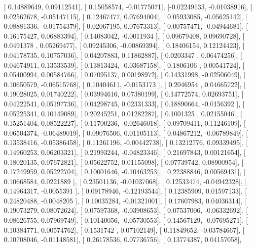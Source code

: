 \documentclass{article}
\begin{document}
       [ 0.14889649,  0.09112541],
       [ 0.15058574, -0.01775071],
       [-0.02249133, -0.01038916],
       [ 0.02562678, -0.05147115],
       [ 0.12467477,  0.07694004],
       [ 0.05933085, -0.05625142],
       [ 0.08881336, -0.01754379],
       [-0.02067195,  0.07673313],
       [-0.00757471, -0.04944681],
       [ 0.16175427,  0.06883394],
       [ 0.14083042, -0.0011934 ],
       [ 0.09679408,  0.09690728],
       [ 0.0491378 ,  0.05269477],
       [ 0.09245306, -0.00869394],
       [ 0.18406154,  0.12124423],
       [ 0.04178735,  0.10757036],
       [ 0.04207883,  0.11862887],
       [ 0.0203347 ,  0.06474256],
       [ 0.04674911,  0.13533539],
       [ 0.13813424, -0.03687158],
       [ 0.1806106 ,  0.00541724],
       [ 0.05400994,  0.00584766],
       [ 0.07095137,  0.00198972],
       [ 0.14331998, -0.02506049],
       [ 0.10650579, -0.06515768],
       [ 0.10404611, -0.0153173 ],
       [ 0.2046954 ,  0.04665722],
       [ 0.19028025,  0.01740222],
       [ 0.03994616,  0.07380199],
       [ 0.14772574,  0.02693751],
       [ 0.04222541,  0.05197736],
       [ 0.04298745,  0.02331333],
       [ 0.18890664, -0.0156392 ],
       [ 0.05225341,  0.10149089],
       [ 0.20245251,  0.01282287],
       [ 0.1001325 ,  0.02155046],
       [ 0.15251404,  0.08522227],
       [ 0.11700236, -0.02646018],
       [ 0.09709411,  0.11246109],
       [ 0.06504374, -0.06489019],
       [ 0.09076506,  0.01105113],
       [ 0.04867212, -0.06789849],
       [ 0.13538416, -0.05386458],
       [ 0.11261196, -0.00442738],
       [ 0.13212776,  0.09339495],
       [ 0.14960253,  0.06203321],
       [ 0.21993244, -0.04823346],
       [ 0.21697843,  0.00121654],
       [ 0.18020135,  0.07672821],
       [ 0.05622752,  0.01155098],
       [ 0.07739742,  0.08900954],
       [ 0.17249959,  0.05222704],
       [ 0.10001646, -0.10463253],
       [ 0.22388846,  0.00569431],
       [ 0.10668584,  0.0221889 ],
       [ 0.23501136, -0.01037068],
       [ 0.12533474, -0.04942328],
       [ 0.14964317, -0.0055391 ],
       [ 0.09178946, -0.12193544],
       [ 0.12385909,  0.01597133],
       [ 0.24820488, -0.0048205 ],
       [ 0.10035284, -0.01321001],
       [ 0.17607983,  0.04036314],
       [ 0.19073279,  0.08072624],
       [ 0.07597368, -0.03908653],
       [ 0.07537006, -0.06332692],
       [ 0.08626755,  0.07969749],
       [ 0.10140056, -0.05730553],
       [ 0.14567129, -0.07695271],
       [ 0.10384771,  0.00574762],
       [ 0.1531742 ,  0.07102149],
       [ 0.11849652, -0.03784667],
       [ 0.10708046, -0.01148581],
       [ 0.26178536,  0.07736756],
       [ 0.13774387,  0.04157058],
\end{document}
